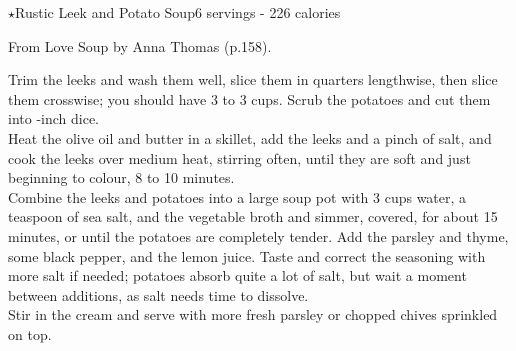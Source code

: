 \begin{recipe}{\texorpdfstring{$\star$}{str}Rustic Leek and Potato Soup}{6 servings - 226 calories}{}

\freeform From {\normalfont Love Soup} by Anna Thomas (p.158).


Trim the leeks and wash them well, slice them in quarters lengthwise, then slice them crosswise; you should have 3 to 3  cups. Scrub the potatoes and cut them into -inch dice.\\

Heat the olive oil and butter in a skillet, add the leeks and a pinch of salt, and cook the leeks over medium heat, stirring often, until they are soft and just beginning to colour, 8 to 10 minutes.\\

Combine the leeks and potatoes into a large soup pot with 3 cups water, a teaspoon of sea salt, and the vegetable broth and simmer, covered, for about 15 minutes, or until the potatoes are completely tender. Add the parsley and thyme, some black pepper, and the lemon juice. Taste and correct the seasoning with more salt if needed; potatoes absorb quite a lot of salt, but wait a moment between additions, as salt needs time to dissolve.\\

Stir in the cream and serve with more fresh parsley or chopped chives sprinkled on top.

\end{recipe}